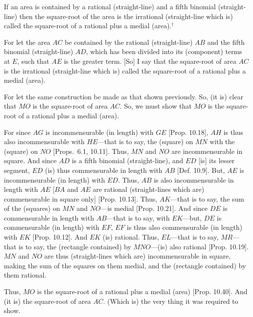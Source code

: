 \begin{Parallel}{}{}
{If an area is contained by a rational (straight-line)
and a fifth binomial (straight-line) then the square-root of the area is
the irrational (straight-line which is) called the square-root of a rational
plus a medial (area).$^\dag$

For let the area $AC$ be contained by the rational (straight-line) $AB$
and the fifth binomial (straight-line) $AD$, which has been divided into its
(component) terms at $E$, such that $AE$ is the greater term. [So] I say that
the square-root of area $AC$ is the irrational (straight-line which is)
called the square-root of a rational plus a medial (area).

\epsfysize=1.35in
\centerline{}

For let the same construction  be made as that shown previously.
So, (it is) clear that $MO$ is the square-root of area $AC$.
So, we must show that $MO$ is the square-root of a rational plus a medial
(area).

 For since $AG$ is incommensurable (in length) with $GE$ [Prop. 10.18], $AH$ is thus also
 incommensurable with $HE$---that is to say, the (square) on $MN$
 with the (square) on $NO$ [Props.~6.1, 10.11]. Thus, $MN$ and $NO$
 are incommensurable in square. And since $AD$ is a fifth
 binomial (straight-line), and $ED$ [is] its lesser segment, $ED$
 (is) thus commensurable in length with $AB$ [Def. 10.9]. But, $AE$ is incommensurable (in length) with $ED$. Thus, $AB$ is also incommensurable in length with $AE$
 [$BA$ and $AE$ are rational (straight-lines which are) commensurable
 in square only] [Prop. 10.13]. Thus, $AK$---that
 is to say, the sum of the (squares) on $MN$ and $NO$---is medial [Prop. 10.21]. And since $DE$ is
 commensurable in length with $AB$---that is to say, with $EK$---but,
 $DE$ is commensurable (in length) with $EF$, $EF$ is thus
also  commensurable (in length) with $EK$ [Prop. 10.12]. And $EK$ (is) rational. Thus, $EL$---that is to say, $MR$---that is to say, the (rectangle contained) by
$MNO$---(is) also rational [Prop. 10.19]. 
$MN$ and $NO$ are thus (straight-lines which are) incommensurable in square, making
the sum of the squares on them medial, and the (rectangle contained)
by them rational.

Thus, $MO$ is the square-root of a rational plus a medial (area) [Prop. 10.40]. And (it is) the square-root
of area $AC$. (Which is) the very thing it was required to show.}
\end{Parallel}



